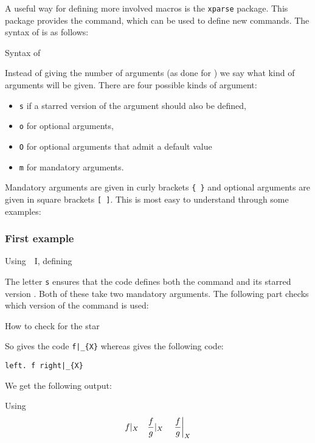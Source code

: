 A useful way for defining more involved macros is the \texttt{xparse} package.
This package provides the  command, which can be used to define new commands.
The syntax of  is as follows:
\begin{showcode}{Syntax of }
\end{showcode}
Instead of giving the number of arguments (as done for ) we say what kind of arguments will be given.
There are four possible kinds of argument:
\begin{itemize}
  \item
    \texttt{s} if a starred version of the argument should also be defined,
  \item
    \texttt{o} for optional arguments,
  \item
    \texttt{O} for optional arguments that admit a default value
  \item 
    \texttt{m} for mandatory arguments.
\end{itemize}
Mandatory arguments are given in curly brackets \texttt{\{ \}} and optional arguments are given in square brackets \texttt{[ ]}.
This is most easy to understand through some examples:

\subsubsection{First example}

\begin{showcode}{Using~~I, defining~}
\end{showcode}
%
The letter \texttt{s} ensures that the code defines both the command  and its starred version .
Both of these take two mandatory arguments.
The following part checks which version of the command is used:
\begin{showcode}{How to check for the star}
\end{showcode}
So  gives the code \texttt{f|\_\{X\}} whereas  gives the following code:
\begin{center}
  \texttt{{\tbs}left. f {\tbs}right|\_\{X\}}
\end{center}
We get the following output:
\begin{showlatex}{Using }
\[
  \restrict{f}{X}
  \quad
  \restrict{\frac{f}{g}}{X}
  \quad
  \restrict*{\frac{f}{g}}{X}
\]
\end{showlatex}

